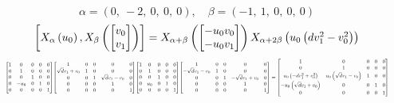 \documentclass[11pt]{article}
\theoremstyle{definition}
\begin{document}
\[
\alpha = \left( 0, \  -2, \  0, \  0, \  0\right), \quad \beta = \left( -1, \  1, \  0, \  0, \  0\right)
\]
\[
\scaletoalign{\textwidth}{\left[ X_{\alpha}\left(u_{0}\right), X_{\beta}\left(\left[\begin{matrix}v_{0}\\v_{1}\end{matrix}\right]\right) \right] = X_{\alpha + \beta}\left(\left[\begin{matrix}- u_{0} v_{0}\\- u_{0} v_{1}\end{matrix}\right]\right) X_{\alpha + 2\beta}\left(u_{0} \left(d v_{1}^{2} - v_{0}^{2}\right)\right)}
\]
\[
\scaletoalign{\textwidth}{{\left[\begin{matrix}1 & 0 & 0 & 0 & 0\\0 & 1 & 0 & 0 & 0\\0 & 0 & 1 & 0 & 0\\0 & - u_{0} & 0 & 1 & 0\\0 & 0 & 0 & 0 & 1\end{matrix}\right]} {\left[\begin{matrix}1 & 0 & 0 & 0 & 0\\\sqrt{d} v_{1} + v_{0} & 1 & 0 & 0 & 0\\0 & 0 & 1 & \sqrt{d} v_{1} - v_{0} & 0\\0 & 0 & 0 & 1 & 0\\0 & 0 & 0 & 0 & 1\end{matrix}\right]} {\left[\begin{matrix}1 & 0 & 0 & 0 & 0\\0 & 1 & 0 & 0 & 0\\0 & 0 & 1 & 0 & 0\\0 & u_{0} & 0 & 1 & 0\\0 & 0 & 0 & 0 & 1\end{matrix}\right]} {\left[\begin{matrix}1 & 0 & 0 & 0 & 0\\- \sqrt{d} v_{1} - v_{0} & 1 & 0 & 0 & 0\\0 & 0 & 1 & - \sqrt{d} v_{1} + v_{0} & 0\\0 & 0 & 0 & 1 & 0\\0 & 0 & 0 & 0 & 1\end{matrix}\right]} = {\left[\begin{matrix}1 & 0 & 0 & 0 & 0\\0 & 1 & 0 & 0 & 0\\u_{0} \left(- d v_{1}^{2} + v_{0}^{2}\right) & u_{0} \left(\sqrt{d} v_{1} - v_{0}\right) & 1 & 0 & 0\\- u_{0} \left(\sqrt{d} v_{1} + v_{0}\right) & 0 & 0 & 1 & 0\\0 & 0 & 0 & 0 & 1\end{matrix}\right]}}
\]
\end{document}
